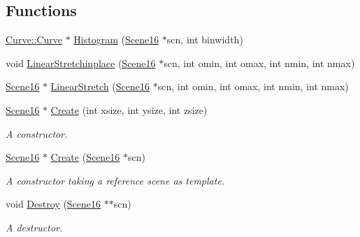 \subsection*{Functions}
\begin{DoxyCompactItemize}
\item 
\hyperlink{namespacegft_1_1Curve_acc891f63f04c17f7b2cafe7ed9ecffdb}{Curve\-::\-Curve} $\ast$ \hyperlink{namespacegft_1_1Scene16_a4348db9e82ed5b133df9c6bcc9730cc8}{Histogram} (\hyperlink{namespacegft_1_1Scene16_a5a4b9571f9e3e6e1393f03bc708bf5ae}{Scene16} $\ast$scn, int binwidth)
\item 
void \hyperlink{namespacegft_1_1Scene16_a549e2be62ddbc808f15f2618a72225a8}{Linear\-Stretchinplace} (\hyperlink{namespacegft_1_1Scene16_a5a4b9571f9e3e6e1393f03bc708bf5ae}{Scene16} $\ast$scn, int omin, int omax, int nmin, int nmax)
\item 
\hyperlink{namespacegft_1_1Scene16_a5a4b9571f9e3e6e1393f03bc708bf5ae}{Scene16} $\ast$ \hyperlink{namespacegft_1_1Scene16_afc66938b527550aca75ae95448bd1b31}{Linear\-Stretch} (\hyperlink{namespacegft_1_1Scene16_a5a4b9571f9e3e6e1393f03bc708bf5ae}{Scene16} $\ast$scn, int omin, int omax, int nmin, int nmax)
\item 
\hyperlink{namespacegft_1_1Scene16_a5a4b9571f9e3e6e1393f03bc708bf5ae}{Scene16} $\ast$ \hyperlink{namespacegft_1_1Scene16_a5670ec6f80a34562bd9b1d841ce9d50b}{Create} (int xsize, int ysize, int zsize)
\begin{DoxyCompactList}\small\item\em A constructor. \end{DoxyCompactList}\item 
\hyperlink{namespacegft_1_1Scene16_a5a4b9571f9e3e6e1393f03bc708bf5ae}{Scene16} $\ast$ \hyperlink{namespacegft_1_1Scene16_a060e453508078f16d404483157275cfd}{Create} (\hyperlink{namespacegft_1_1Scene16_a5a4b9571f9e3e6e1393f03bc708bf5ae}{Scene16} $\ast$scn)
\begin{DoxyCompactList}\small\item\em A constructor taking a reference scene as template. \end{DoxyCompactList}\item 
void \hyperlink{namespacegft_1_1Scene16_af18edf0cca9663e969d241e32a26f114}{Destroy} (\hyperlink{namespacegft_1_1Scene16_a5a4b9571f9e3e6e1393f03bc708bf5ae}{Scene16} $\ast$$\ast$scn)
\begin{DoxyCompactList}\small\item\em A destructor. \end{DoxyCompactList}\item 
$$
\end{DoxyCompactItemize}
